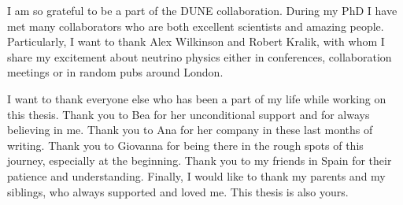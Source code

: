 I am so grateful to be a part of the DUNE collaboration. During my PhD I have met many collaborators who are both excellent scientists and amazing people. Particularly, I want to thank Alex Wilkinson and Robert Kralik, with whom I share my excitement about neutrino physics either in conferences, collaboration meetings or in random pubs around London.

I want to thank everyone else who has been a part of my life while working on this thesis. Thank you to Bea for her unconditional support and for always believing in me. Thank you to Ana for her company in these last months of writing. Thank you to Giovanna for being there in the rough spots of this journey, especially at the beginning. Thank you to my friends in Spain for their patience and understanding. Finally, I would like to thank my parents and my siblings, who always supported and loved me. This thesis is also yours.